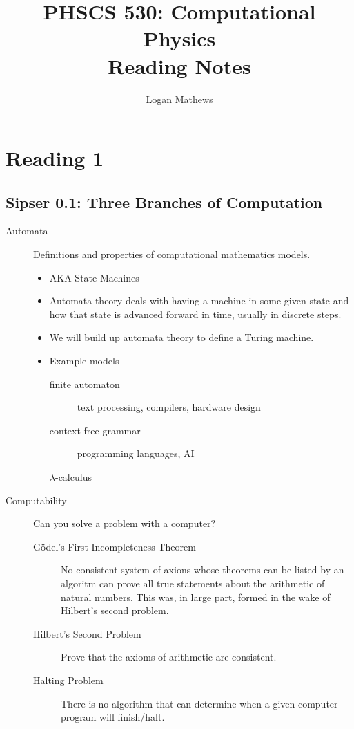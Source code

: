 \documentclass{article}
\title{PHSCS 530: Computational Physics\\\large Reading Notes}
\author{Logan Mathews}
\begin{document}
\maketitle
\pagebreak
\tableofcontents
\pagebreak
\section{Reading 1}
\subsection{Sipser 0.1: Three Branches of Computation}
\begin{description}
    \item [Automata] Definitions and properties of computational mathematics models.
    \begin{itemize}
        \item AKA State Machines
        \item Automata theory deals with having a machine in some given state and how that state is advanced forward in time, usually in discrete steps.
        \item We will build up automata theory to define a Turing machine.
        \item Example models
        \begin{description}
            \item [finite automaton] text processing, compilers, hardware design
            \item [context-free grammar] programming languages, AI
            \item [$\lambda$-calculus]
        \end{description}
    \end{itemize}
    \item [Computability] Can you solve a problem with a computer?
    \begin{description}
        \item [Gödel's First Incompleteness Theorem] No consistent system of axions whose theorems can be listed by an algoritm can prove all true statements about the arithmetic of natural numbers. This was, in large part, formed in the wake of Hilbert's second problem.
        \item [Hilbert's Second Problem] Prove that the axioms of arithmetic are consistent.
        \item [Halting Problem] There is no algorithm that can determine when a given computer program will finish/halt.
    \end{description}

\end{description}
\end{document}
